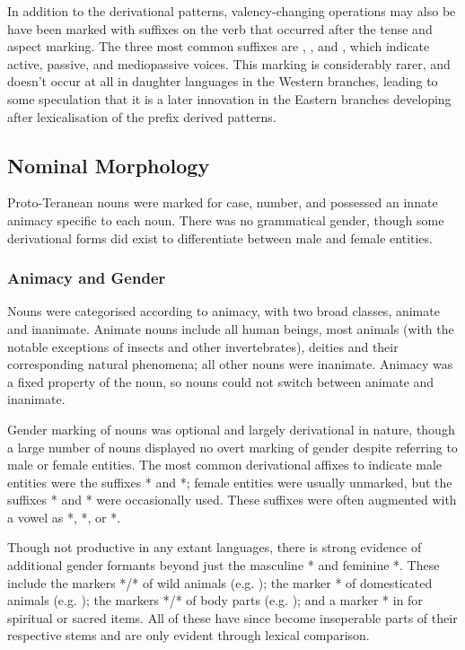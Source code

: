 \documentclass[grammar]{subfiles}
\begin{document}
In addition to the derivational patterns, valency-changing operations may also
be have been marked with suffixes on the verb that occurred after the tense and
aspect marking.  The three most common suffixes are , ,
and , which indicate active, passive, and mediopassive voices.
This marking is considerably rarer, and doesn't occur at all in daughter
languages in the Western branches, leading to some speculation that it is a
later innovation in the Eastern branches developing after lexicalisation of the
prefix derived patterns.

\subsection{Nominal Morphology}
\label{ssec:history:pt:nominal_morphology}

Proto-Teranean nouns were marked for case, number, and possessed an innate
animacy specific to each noun.  There was no grammatical gender, though some
derivational forms did exist to differentiate between male and female entities.

\subsubsection{Animacy and Gender}
\label{sssec:history:pt:nm:animacy}

Nouns were categorised according to animacy, with two broad classes, animate
and inanimate.  Animate nouns include all human beings, most animals (with the
notable exceptions of insects and other invertebrates), deities and their
corresponding natural phenomena; all other nouns were inanimate.  Animacy was a
fixed property of the noun, so nouns could not switch between animate and
inanimate.

Gender marking of nouns was optional and largely derivational in nature, though
a large number of nouns displayed no overt marking of gender despite referring
to male or female entities.  The most common derivational affixes to indicate
male entities were the suffixes * and *; female
entities were usually unmarked, but the suffixes * and
* were occasionally used.  These suffixes were often augmented
with a vowel as *, *, or *.

Though not productive in any extant languages, there is strong evidence of
additional gender formants beyond just the masculine * and feminine
*.  These include the markers */* of wild
animals (e.g.  \tbw); the marker * of domesticated animals (e.g.
\tbw); the markers */* of body parts (e.g. \tbw); and a
marker * in for spiritual or sacred items.  All of these have since
become inseperable parts of their respective stems and are only evident through
lexical comparison.
\end{document}
